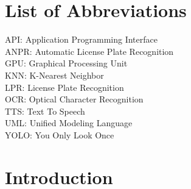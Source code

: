 {
\KECadjusttocspacings %
\makeatletter
\def\@makeschapterhead#1{%
  {\newpage \parindent \z@ \raggedright
    \normalfont
    \interlinepenalty\@M
    \center \fontsize{16pt}{1} \bfseries \MakeUppercase{#1}\par\nobreak
    \vskip 18\p@ %
  }}
\makeatother 

\tableofcontents %
\listoffigures %


\chapter*{List of Abbreviations}
	API: Application Programming Interface\\
	ANPR: Automatic License Plate Recognition\\
	GPU: Graphical Processing Unit\\
	KNN: K-Nearest Neighbor\\
	LPR: License Plate Recognition\\
	OCR: Optical Character Recognition \\
	TTS: Text To Speech\\
	UML: Unified Modeling Language\\
	YOLO: You Only Look Once\\
	
	
	
	
}



\newpage
{} %

\chapter{Introduction}

